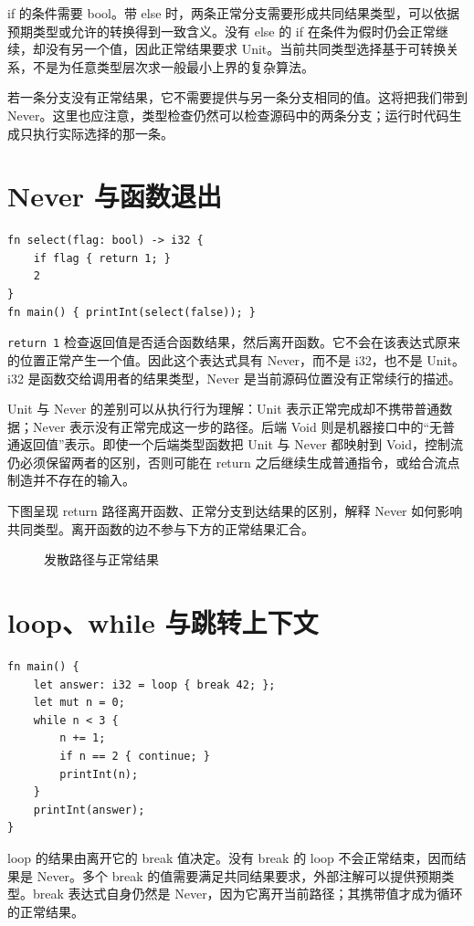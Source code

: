 if 的条件需要 bool。带 else 时，两条正常分支需要形成共同结果类型，可以依据预期类型或允许的转换得到一致含义。没有 else 的 if 在条件为假时仍会正常继续，却没有另一个值，因此正常结果要求 Unit。当前共同类型选择基于可转换关系，不是为任意类型层次求一般最小上界的复杂算法。

若一条分支没有正常结果，它不需要提供与另一条分支相同的值。这将把我们带到 Never。这里也应注意，类型检查仍然可以检查源码中的两条分支；运行时代码生成只执行实际选择的那一条。

\section{Never 与函数退出}
\begin{lstlisting}[language=Rustless]
fn select(flag: bool) -> i32 {
    if flag { return 1; }
    2
}
fn main() { printInt(select(false)); }
\end{lstlisting}
\lstinline[language=Rustless]|return 1| 检查返回值是否适合函数结果，然后离开函数。它不会在该表达式原来的位置正常产生一个值。因此这个表达式具有 Never，而不是 i32，也不是 Unit。i32 是函数交给调用者的结果类型，Never 是当前源码位置没有正常续行的描述。

Unit 与 Never 的差别可以从执行行为理解：Unit 表示正常完成却不携带普通数据；Never 表示没有正常完成这一步的路径。后端 Void 则是机器接口中的“无普通返回值”表示。即使一个后端类型函数把 Unit 与 Never 都映射到 Void，控制流仍必须保留两者的区别，否则可能在 return 之后继续生成普通指令，或给合流点制造并不存在的输入。

下图呈现 return 路径离开函数、正常分支到达结果的区别，解释 Never 如何影响共同类型。离开函数的边不参与下方的正常结果汇合。
\begin{figure}[htbp]
\centering
{}
\caption{发散路径与正常结果}
\end{figure}

\section{loop、while 与跳转上下文}
\begin{lstlisting}[language=Rustless]
fn main() {
    let answer: i32 = loop { break 42; };
    let mut n = 0;
    while n < 3 {
        n += 1;
        if n == 2 { continue; }
        printInt(n);
    }
    printInt(answer);
}
\end{lstlisting}
loop 的结果由离开它的 break 值决定。没有 break 的 loop 不会正常结束，因而结果是 Never。多个 break 的值需要满足共同结果要求，外部注解可以提供预期类型。break 表达式自身仍然是 Never，因为它离开当前路径；其携带值才成为循环的正常结果。

